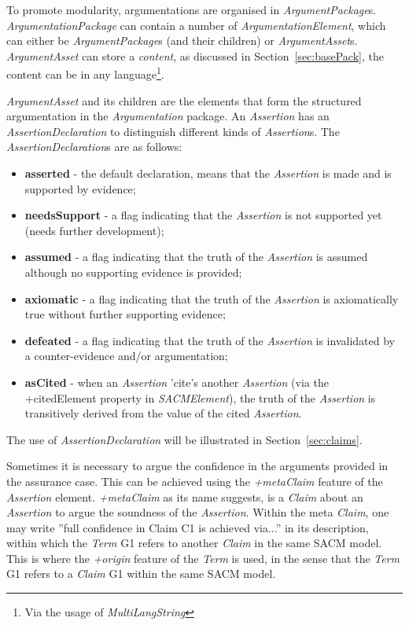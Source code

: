 To promote modularity, argumentations are organised in \textit{ArgumentPackage}s. \textit{ArgumentationPackage} can contain a number of \textit{ArgumentationElement}, which can either be \textit{ArgumentPackage}s (and their children) or \textit{ArgumentAsset}s. \textit{ArgumentAsset} can store a \textit{content}, as discussed in Section~\ref{sec:basePack}, the content can be in any language\footnote{Via the usage of \textit{MultiLangString}}.

\textit{ArgumentAsset} and its children are the elements that form the structured argumentation in the \textit{Argumentation} package. An \textit{Assertion} has an \textit{AssertionDeclaration} to distinguish different kinds of \textit{Assertion}s. The \textit{AssertionDeclaration}s are as follows: 

\begin{itemize}
	\item \textbf{asserted} - the default declaration, means that the \textit{Assertion} is made and is supported by evidence;
	\item \textbf{needsSupport} - a flag indicating that the \textit{Assertion} is not supported yet (needs further development);
	\item \textbf{assumed} - a flag indicating that the truth of the \textit{Assertion} is assumed although no supporting evidence is provided;
	\item \textbf{axiomatic} - a flag indicating that the truth of the \textit{Assertion} is axiomatically true without further supporting evidence;
	\item \textbf{defeated} - a flag indicating that the truth of the \textit{Assertion} is invalidated by a counter-evidence and/or argumentation;
	\item \textbf{asCited} - when an \textit{Assertion} 'cite's another \textit{Assertion} (via the +citedElement property in \textit{SACMElement}), the truth of the \textit{Assertion} is transitively derived from the value of the cited \textit{Assertion}.
\end{itemize}

The use of \textit{AssertionDeclaration} will be illustrated in Section~\ref{sec:claims}.

Sometimes it is necessary to argue the confidence in the arguments provided in the assurance case. This can be achieved using the \textit{+metaClaim} feature of the \textit{Assertion} element. \textit{+metaClaim} as its name suggests, is a \textit{Claim} about an \textit{Assertion} to argue the soundness of the \textit{Assertion}. Within the meta \textit{Claim}, one may write ''full confidence in Claim C1 is achieved via...'' in its description, within which the \textit{Term} G1 refers to another \textit{Claim} in the same SACM model. This is where the \textit{+origin} feature of the \textit{Term} is used, in the sense that the \textit{Term} G1 refers to a \textit{Claim} G1 within the same SACM model.

